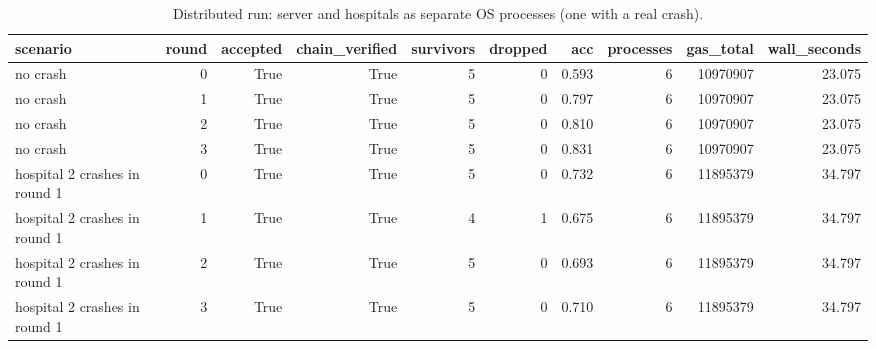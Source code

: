 \begin{table}
\caption{Distributed run: server and hospitals as separate OS processes (one with a real crash).}
\label{tab:T11_distributed_run}
\begin{tabular}{lrrrrrrrrr}
\toprule
scenario & round & accepted & chain\_verified & survivors & dropped & acc & processes & gas\_total & wall\_seconds \\
\midrule
no crash & 0 & True & True & 5 & 0 & 0.593 & 6 & 10970907 & 23.075 \\
no crash & 1 & True & True & 5 & 0 & 0.797 & 6 & 10970907 & 23.075 \\
no crash & 2 & True & True & 5 & 0 & 0.810 & 6 & 10970907 & 23.075 \\
no crash & 3 & True & True & 5 & 0 & 0.831 & 6 & 10970907 & 23.075 \\
hospital 2 crashes in round 1 & 0 & True & True & 5 & 0 & 0.732 & 6 & 11895379 & 34.797 \\
hospital 2 crashes in round 1 & 1 & True & True & 4 & 1 & 0.675 & 6 & 11895379 & 34.797 \\
hospital 2 crashes in round 1 & 2 & True & True & 5 & 0 & 0.693 & 6 & 11895379 & 34.797 \\
hospital 2 crashes in round 1 & 3 & True & True & 5 & 0 & 0.710 & 6 & 11895379 & 34.797 \\
\bottomrule
\end{tabular}
\end{table}
